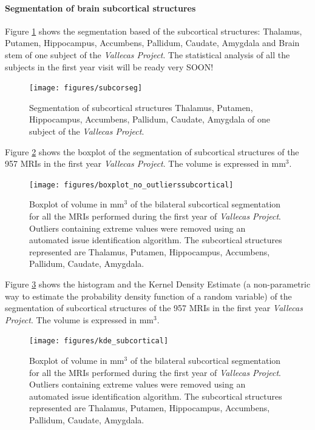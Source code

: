 \documentclass[11pt]{article}
\theoremstyle{definition}
\theoremstyle{remark}
\begin{document}
\paragraph*{Segmentation of brain subcortical structures}

Figure \ref{fig:subcorseg} shows the segmentation based of the subcortical structures: Thalamus, Putamen, Hippocampus, Accumbens, Pallidum, Caudate, Amygdala and Brain stem of one subject of the \emph{Vallecas Project}. The statistical analysis of all the subjects in the first year visit  will be ready very SOON! 

\begin{figure}[H]
        \centering
        \texttt{[image: figures/subcorseg]}
        \caption{Segmentation of subcortical structures Thalamus, Putamen, Hippocampus, Accumbens, Pallidum, Caudate, Amygdala of one subject of the \emph{Vallecas Project}. } 
        \label{fig:subcorseg}
\end{figure}

Figure \ref{fig:boxsubcor} shows the boxplot of the segmentation of subcortical structures of the 957 MRIs in the first year \emph{Vallecas Project}. The volume is expressed in mm${^3}$.
\begin{figure}[H]
        \centering
        \texttt{[image: figures/boxplot\_no\_outlierssubcortical]}
        \caption{Boxplot of volume in mm${^3}$ of the bilateral subcortical segmentation for all the MRIs performed during the first year of \emph{Vallecas Project}. Outliers containing extreme values were removed using an automated issue identification algorithm. The subcortical structures represented are Thalamus, Putamen, Hippocampus, Accumbens, Pallidum, Caudate, Amygdala.} 
        \label{fig:boxsubcor}
\end{figure}

Figure \ref{fig:kde_subcortical} shows the histogram and the Kernel Density Estimate (a non-parametric way to estimate the probability density function of a random variable) of the segmentation of subcortical structures of the 957 MRIs in the first year \emph{Vallecas Project}. The volume is expressed in mm${^3}$.
\begin{figure}[H]
        \centering
        \texttt{[image: figures/kde\_subcortical]}
        \caption{Boxplot of volume in mm${^3}$ of the bilateral subcortical segmentation for all the MRIs performed during the first year of \emph{Vallecas Project}. Outliers containing extreme values were removed using an automated issue identification algorithm. The subcortical structures represented are Thalamus, Putamen, Hippocampus, Accumbens, Pallidum, Caudate, Amygdala.} 
        \label{fig:kde_subcortical}
\end{figure}
\end{document}
